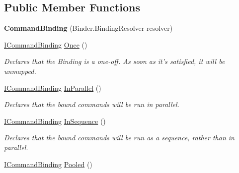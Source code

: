 \subsection*{Public Member Functions}
\begin{DoxyCompactItemize}
\item 
\hypertarget{classstrange_1_1extensions_1_1command_1_1impl_1_1_command_binding_a2363022e91a8f9f676d20c87bc3944e3}{{\bfseries Command\-Binding} (Binder.\-Binding\-Resolver resolver)}\label{classstrange_1_1extensions_1_1command_1_1impl_1_1_command_binding_a2363022e91a8f9f676d20c87bc3944e3}

\item 
\hypertarget{classstrange_1_1extensions_1_1command_1_1impl_1_1_command_binding_a8e9748be1b68811006095c2b91b226f6}{\hyperlink{interfacestrange_1_1extensions_1_1command_1_1api_1_1_i_command_binding}{I\-Command\-Binding} \hyperlink{classstrange_1_1extensions_1_1command_1_1impl_1_1_command_binding_a8e9748be1b68811006095c2b91b226f6}{Once} ()}\label{classstrange_1_1extensions_1_1command_1_1impl_1_1_command_binding_a8e9748be1b68811006095c2b91b226f6}

\begin{DoxyCompactList}\small\item\em Declares that the Binding is a one-\/off. As soon as it's satisfied, it will be unmapped. \end{DoxyCompactList}\item 
\hyperlink{interfacestrange_1_1extensions_1_1command_1_1api_1_1_i_command_binding}{I\-Command\-Binding} \hyperlink{classstrange_1_1extensions_1_1command_1_1impl_1_1_command_binding_a25ea62fb08609aaba172f2c1c8c6efa6}{In\-Parallel} ()
\begin{DoxyCompactList}\small\item\em Declares that the bound commands will be run in parallel. \end{DoxyCompactList}\item 
\hypertarget{classstrange_1_1extensions_1_1command_1_1impl_1_1_command_binding_a9969c6ea7325cd974a80383f800f92dd}{\hyperlink{interfacestrange_1_1extensions_1_1command_1_1api_1_1_i_command_binding}{I\-Command\-Binding} \hyperlink{classstrange_1_1extensions_1_1command_1_1impl_1_1_command_binding_a9969c6ea7325cd974a80383f800f92dd}{In\-Sequence} ()}\label{classstrange_1_1extensions_1_1command_1_1impl_1_1_command_binding_a9969c6ea7325cd974a80383f800f92dd}

\begin{DoxyCompactList}\small\item\em Declares that the bound commands will be run as a sequence, rather than in parallel. \end{DoxyCompactList}\item 
\hypertarget{classstrange_1_1extensions_1_1command_1_1impl_1_1_command_binding_a0332626d6d9db62876b084c57ca60609}{\hyperlink{interfacestrange_1_1extensions_1_1command_1_1api_1_1_i_command_binding}{I\-Command\-Binding} \hyperlink{classstrange_1_1extensions_1_1command_1_1impl_1_1_command_binding_a0332626d6d9db62876b084c57ca60609}{Pooled} ()}\label{classstrange_1_1extensions_1_1command_1_1impl_1_1_command_binding_a0332626d6d9db62876b084c57ca60609}


\end{DoxyCompactItemize}
